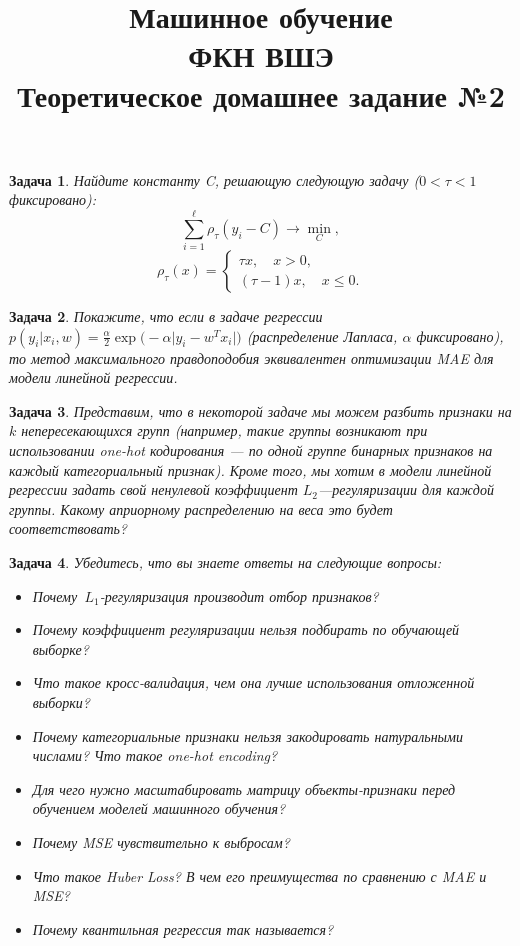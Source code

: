 \documentclass[12pt,fleqn]{article}
\newtheorem{esProblem}{Задача}
\begin{document}
\title{Машинное обучение\\ФКН ВШЭ\\Теоретическое домашнее задание №2}
\date{}
\author{}
\maketitle

\begin{esProblem}
    Найдите константу C, решающую следующую задачу ($0 < \tau < 1$ фиксировано):
    \[
    \sum_{i=1}^\ell \rho_\tau (y_i - C) \rightarrow \min_{C},
    \]
    \[
    \rho_\tau(x) = \begin{cases} \tau x, \quad x > 0, \\ (\tau - 1) x, \quad x \leqslant 0. \end{cases}
    \]
\end{esProblem}

\begin{esProblem}
    Покажите, что если в задаче регрессии $p(y_i|x_i, w) = \frac \alpha 2 \exp \bigl( -\alpha \bigl|y_i - w^Tx_i\bigr| \bigr)$ (распределение Лапласа,  $\alpha$ фиксировано), то метод максимального правдоподобия эквивалентен оптимизации MAE для модели линейной регрессии.
\end{esProblem}

\begin{esProblem}
	Представим, что в некоторой задаче мы можем разбить признаки на $k$ непересекающихся групп (например, такие группы возникают при использовании one-hot кодирования  --- по одной группе бинарных признаков на каждый категориальный признак). Кроме того, мы хотим в модели линейной регрессии задать свой ненулевой коэффициент $L_2$---регуляризации для каждой группы. Какому априорному распределению на веса это будет соответствовать?
\end{esProblem}

\begin{esProblem}
    Убедитесь, что вы знаете ответы на следующие вопросы:
    \begin{itemize}
        \item Почему~$L_1$-регуляризация производит отбор признаков?
        \item Почему коэффициент регуляризации нельзя подбирать по обучающей выборке?
        \item Что такое кросс-валидация, чем она лучше использования отложенной выборки?
        \item Почему категориальные признаки нельзя закодировать натуральными числами? Что такое one-hot encoding?
        \item Для чего нужно масштабировать матрицу объекты-признаки перед обучением моделей машинного обучения?
        \item Почему MSE чувствительно к выбросам?
        \item Что такое Huber Loss? В чем его преимущества по сравнению с MAE и MSE?
        \item Почему квантильная регрессия так называется?
    \end{itemize}
\end{esProblem}
\end{document}
